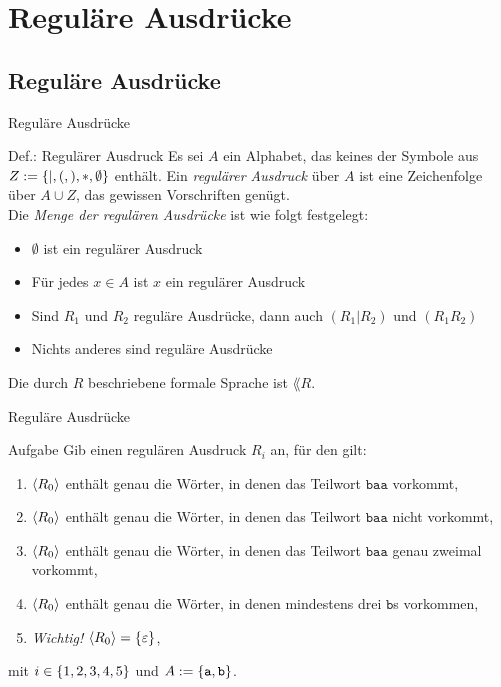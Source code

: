 \section{Reguläre Ausdrücke}
\subsection{Reguläre Ausdrücke}

\begin{frame}{Reguläre Ausdrücke}
\begin{block}{Def.: Regulärer Ausdruck}
	Es sei $A$ ein Alphabet, das keines der Symbole aus $Z := \left\{ \mid, (, ), *, \emptyset \right\}$ enthält.
	Ein \emph{regulärer Ausdruck} über $A$ ist eine Zeichenfolge über $A \cup Z$, das gewissen Vorschriften genügt.\\
	Die \emph{Menge der regulären Ausdrücke} ist wie folgt festgelegt:
	\begin{itemize}
		\item $\emptyset$ ist ein regulärer Ausdruck
		\item Für jedes $x \in A$ ist $x$ ein regulärer Ausdruck
		\item Sind $R_1$ und $R_2$ reguläre Ausdrücke, dann auch $(R_1 | R_2 )$ und $(R_1R_2)$
		\item Nichts anderes sind reguläre Ausdrücke
	\end{itemize}
	Die durch $R$ beschriebene formale Sprache ist $\lang{R}$.
\end{block}
\end{frame}

\begin{frame}{Reguläre Ausdrücke}
\begin{exampleblock}{Aufgabe}
	Gib einen regulären Ausdruck $R_i$ an, für den gilt:
	\begin{enumerate}
		\item $\lang{R_\theenumi}$ enthält genau die Wörter, in denen das Teilwort $\texttt{baa}$ vorkommt,
		\item $\lang{R_\theenumi}$ enthält genau die Wörter, in denen das Teilwort $\texttt{baa}$ nicht vorkommt,
		\item $\lang{R_\theenumi}$ enthält genau die Wörter, in denen das Teilwort $\texttt{baa}$ genau zweimal vorkommt,
		\item $\lang{R_\theenumi}$ enthält genau die Wörter, in denen mindestens drei $\texttt{b}$s vorkommen,
		\item \emph{Wichtig!} $\lang{R_\theenumi} = \set{\varepsilon}$,
	\end{enumerate}
	mit $i \in \left\{ 1,2,3,4,5 \right\}$ und $A := \left\{ \texttt{a}, \texttt{b} \right\}$.
\end{exampleblock}
\end{frame}

